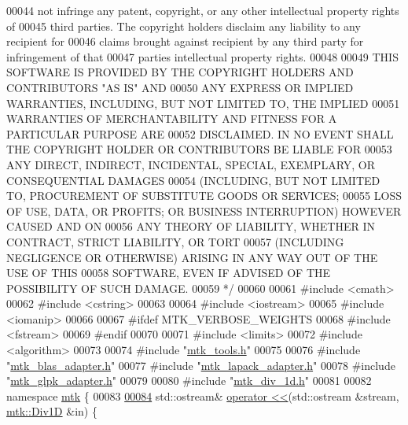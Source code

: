 \begin{DoxyCode}
00044 \textcolor{comment}{not infringe any patent, copyright, or any other intellectual property rights of}
00045 \textcolor{comment}{third parties. The copyright holders disclaim any liability to any recipient for}
00046 \textcolor{comment}{claims brought against recipient by any third party for infringement of that}
00047 \textcolor{comment}{parties intellectual property rights.}
00048 \textcolor{comment}{}
00049 \textcolor{comment}{THIS SOFTWARE IS PROVIDED BY THE COPYRIGHT HOLDERS AND CONTRIBUTORS "AS IS" AND}
00050 \textcolor{comment}{ANY EXPRESS OR IMPLIED WARRANTIES, INCLUDING, BUT NOT LIMITED TO, THE IMPLIED}
00051 \textcolor{comment}{WARRANTIES OF MERCHANTABILITY AND FITNESS FOR A PARTICULAR PURPOSE ARE}
00052 \textcolor{comment}{DISCLAIMED. IN NO EVENT SHALL THE COPYRIGHT HOLDER OR CONTRIBUTORS BE LIABLE FOR}
00053 \textcolor{comment}{ANY DIRECT, INDIRECT, INCIDENTAL, SPECIAL, EXEMPLARY, OR CONSEQUENTIAL DAMAGES}
00054 \textcolor{comment}{(INCLUDING, BUT NOT LIMITED TO, PROCUREMENT OF SUBSTITUTE GOODS OR SERVICES;}
00055 \textcolor{comment}{LOSS OF USE, DATA, OR PROFITS; OR BUSINESS INTERRUPTION) HOWEVER CAUSED AND ON}
00056 \textcolor{comment}{ANY THEORY OF LIABILITY, WHETHER IN CONTRACT, STRICT LIABILITY, OR TORT}
00057 \textcolor{comment}{(INCLUDING NEGLIGENCE OR OTHERWISE) ARISING IN ANY WAY OUT OF THE USE OF THIS}
00058 \textcolor{comment}{SOFTWARE, EVEN IF ADVISED OF THE POSSIBILITY OF SUCH DAMAGE.}
00059 \textcolor{comment}{*/}
00060 
00061 \textcolor{preprocessor}{#include <cmath>}
00062 \textcolor{preprocessor}{#include <cstring>}
00063 
00064 \textcolor{preprocessor}{#include <iostream>}
00065 \textcolor{preprocessor}{#include <iomanip>}
00066 
00067 \textcolor{preprocessor}{#ifdef MTK\_VERBOSE\_WEIGHTS}
00068 \textcolor{preprocessor}{#include <fstream>}
00069 \textcolor{preprocessor}{#endif}
00070 
00071 \textcolor{preprocessor}{#include <limits>}
00072 \textcolor{preprocessor}{#include <algorithm>}
00073 
00074 \textcolor{preprocessor}{#include "\hyperlink{mtk__tools_8h}{mtk\_tools.h}"}
00075 
00076 \textcolor{preprocessor}{#include "\hyperlink{mtk__blas__adapter_8h}{mtk\_blas\_adapter.h}"}
00077 \textcolor{preprocessor}{#include "\hyperlink{mtk__lapack__adapter_8h}{mtk\_lapack\_adapter.h}"}
00078 \textcolor{preprocessor}{#include "\hyperlink{mtk__glpk__adapter_8h}{mtk\_glpk\_adapter.h}"}
00079 
00080 \textcolor{preprocessor}{#include "\hyperlink{mtk__div__1d_8h}{mtk\_div\_1d.h}"}
00081 
00082 \textcolor{keyword}{namespace }\hyperlink{namespacemtk}{mtk} \{
00083 
\hypertarget{mtk__div__1d_8cc_source_l00084}{}\hyperlink{namespacemtk_a12db5e6fff3788f728819a60d5c28d01}{00084} std::ostream& \hyperlink{namespacemtk_ad3bcf52cda59ddb5fc7b4bdce76c46dc}{operator <<}(std::ostream &stream, \hyperlink{classmtk_1_1Div1D}{mtk::Div1D} &in) \{

\end{DoxyCode}
